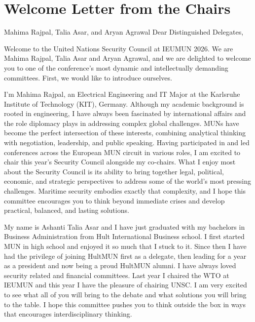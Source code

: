 \section{Welcome Letter from the Chairs}

\begin{chairletter}{Mahima Rajpal, Talia Asar, and Aryan Agrawal}
Dear Distinguished Delegates,

Welcome to the United Nations Security Council at IEUMUN 2026. We are Mahima Rajpal, Talia Asar and Aryan Agrawal, and we are delighted to welcome you to one of the conference's most dynamic and intellectually demanding committees. First, we would like to introduce ourselves.

I’m Mahima Rajpal, an Electrical Engineering and IT Major at the Karlsruhe Institute of Technology (KIT), Germany. Although my academic background is rooted in engineering, I have always been fascinated by international affairs and the role diplomacy plays in addressing complex global challenges. MUNs have become the perfect intersection of these interests, combining analytical thinking with negotiation, leadership, and public speaking. Having participated in and led conferences across the European MUN circuit in various roles, I am excited to chair this year's Security Council alongside my co-chairs. What I enjoy most about the Security Council is its ability to bring together legal, political, economic, and strategic perspectives to address some of the world's most pressing challenges. Maritime security embodies exactly that complexity, and I hope this committee encourages you to think beyond immediate crises and develop practical, balanced, and lasting solutions.

My name is Ashanti Talia Asar and I have just graduated with my bachelors in Business Administration from Hult International Business school. I first started MUN in high school and enjoyed it so much that I stuck to it. Since then I have had the privilege of joining HultMUN first as a delegate, then leading for a year as a president and now being a proud HultMUN alumni. I have always loved security related and financial committees. Last year I chaired the WTO at IEUMUN and this year I have the pleasure of chairing UNSC. I am very excited to see what all of you will bring to the debate and what solutions you will bring to the table. I hope this committee pushes you to think outside the box in ways that encourages interdisciplinary thinking.


\end{chairletter}
